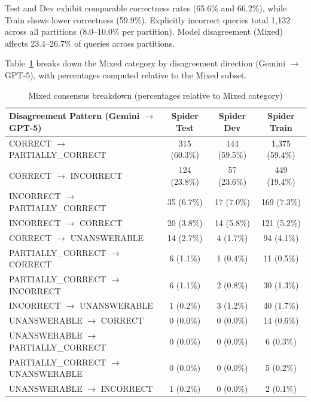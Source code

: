 \documentclass[]{einformatica}
\begin{document}
Test and Dev exhibit comparable correctness rates (65.6\% and 66.2\%), while Train shows lower correctness (59.9\%). Explicitly incorrect queries total 1,132 across all partitions (8.0--10.0\% per partition). Model disagreement (Mixed) affects 23.4--26.7\% of queries across partitions.

Table~\ref{tab:mixed_breakdown} breaks down the Mixed category by disagreement direction (Gemini $\rightarrow$ GPT-5), with percentages computed relative to the Mixed subset.

\begin{table}[ht]
    \caption{Mixed consensus breakdown (percentages relative to Mixed category)}
    \label{tab:mixed_breakdown}
    \centering
    \footnotesize
    \begin{tabular}{lccc}
        \toprule
        \textbf{Disagreement Pattern (Gemini $\rightarrow$ GPT-5)} & \textbf{Spider Test} & \textbf{Spider Dev} & \textbf{Spider Train} \\
        \midrule
        CORRECT $\rightarrow$ PARTIALLY\_CORRECT & 315 (60.3\%) & 144 (59.5\%) & 1,375 (59.4\%) \\
        CORRECT $\rightarrow$ INCORRECT & 124 (23.8\%) & 57 (23.6\%) & 449 (19.4\%) \\
        INCORRECT $\rightarrow$ PARTIALLY\_CORRECT & 35 (6.7\%) & 17 (7.0\%) & 169 (7.3\%) \\
        INCORRECT $\rightarrow$ CORRECT & 20 (3.8\%) & 14 (5.8\%) & 121 (5.2\%) \\
        CORRECT $\rightarrow$ UNANSWERABLE & 14 (2.7\%) & 4 (1.7\%) & 94 (4.1\%) \\
        PARTIALLY\_CORRECT $\rightarrow$ CORRECT & 6 (1.1\%) & 1 (0.4\%) & 11 (0.5\%) \\
        PARTIALLY\_CORRECT $\rightarrow$ INCORRECT & 6 (1.1\%) & 2 (0.8\%) & 30 (1.3\%) \\
        INCORRECT $\rightarrow$ UNANSWERABLE & 1 (0.2\%) & 3 (1.2\%) & 40 (1.7\%) \\
        UNANSWERABLE $\rightarrow$ CORRECT & 0 (0.0\%) & 0 (0.0\%) & 14 (0.6\%) \\
        UNANSWERABLE $\rightarrow$ PARTIALLY\_CORRECT & 0 (0.0\%) & 0 (0.0\%) & 6 (0.3\%) \\
        PARTIALLY\_CORRECT $\rightarrow$ UNANSWERABLE & 0 (0.0\%) & 0 (0.0\%) & 5 (0.2\%) \\
        UNANSWERABLE $\rightarrow$ INCORRECT & 1 (0.2\%) & 0 (0.0\%) & 2 (0.1\%) \\
        \bottomrule
    \end{tabular}
\end{table}
\end{document}
